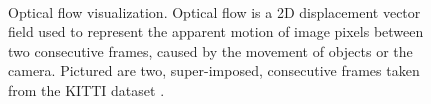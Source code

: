 \begin{figure}[t]
\begin{center}
	\\
	\caption[Optical flow visualization]{Optical flow visualization. Optical flow is a 2D displacement vector field used to represent the apparent motion of image pixels between two consecutive frames, caused by the movement of objects or the camera. Pictured are two, super-imposed, consecutive frames taken from the KITTI dataset \cite{geiger2013vision}. }
	\vspace{-0.65cm}
	\label{fig:optical_flow}
\end{center}
\end{figure}